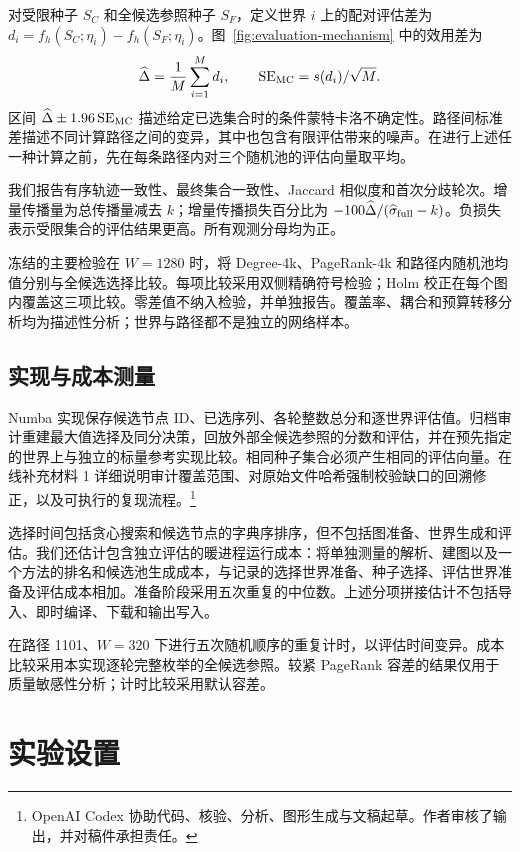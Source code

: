 \documentclass[smallextended]{svjour3}
\begin{document}
对受限种子 $S_C$ 和全候选参照种子 $S_F$，定义世界 $i$ 上的配对评估差为 $d_i=f_h(S_C;\eta_i)-f_h(S_F;\eta_i)$。图~\ref{fig:evaluation-mechanism} 中的效用差为
\begin{equation}
\widehat\Delta=\frac{1}{M}\sum_{i=1}^{M}d_i,
\qquad \operatorname{SE}_{\rm MC}=s(d_i)/\sqrt M.
\end{equation}
区间 $\widehat\Delta\pm1.96\operatorname{SE}_{\rm MC}$ 描述给定已选集合时的条件蒙特卡洛不确定性。路径间标准差描述不同计算路径之间的变异，其中也包含有限评估带来的噪声。在进行上述任一种计算之前，先在每条路径内对三个随机池的评估向量取平均。

我们报告有序轨迹一致性、最终集合一致性、Jaccard 相似度和首次分歧轮次。增量传播量为总传播量减去 $k$；增量传播损失百分比为 $-100\widehat\Delta/(\widehat\sigma_{\rm full}-k)$。负损失表示受限集合的评估结果更高。所有观测分母均为正。

冻结的主要检验在 $W=1280$ 时，将 Degree-4k、PageRank-4k 和路径内随机池均值分别与全候选选择比较。每项比较采用双侧精确符号检验；Holm 校正在每个图内覆盖这三项比较。零差值不纳入检验，并单独报告。覆盖率、耦合和预算转移分析均为描述性分析；世界与路径都不是独立的网络样本。

\subsection{实现与成本测量}
Numba 实现保存候选节点 ID、已选序列、各轮整数总分和逐世界评估值。归档审计重建最大值选择及同分决策，回放外部全候选参照的分数和评估，并在预先指定的世界上与独立的标量参考实现比较。相同种子集合必须产生相同的评估向量。在线补充材料 1 详细说明审计覆盖范围、对原始文件哈希强制校验缺口的回溯修正，以及可执行的复现流程。\footnote{OpenAI Codex 协助代码、核验、分析、图形生成与文稿起草。作者审核了输出，并对稿件承担责任。}

选择时间包括贪心搜索和候选节点的字典序排序，但不包括图准备、世界生成和评估。我们还估计包含独立评估的暖进程运行成本：将单独测量的解析、建图以及一个方法的排名和候选池生成成本，与记录的选择世界准备、种子选择、评估世界准备及评估成本相加。准备阶段采用五次重复的中位数。上述分项拼接估计不包括导入、即时编译、下载和输出写入。

在路径 1101、$W=320$ 下进行五次随机顺序的重复计时，以评估时间变异。成本比较采用本实现逐轮完整枚举的全候选参照。较紧 PageRank 容差的结果仅用于质量敏感性分析；计时比较采用默认容差。

\section{实验设置}\label{sec:experimental-setup}
\end{document}
